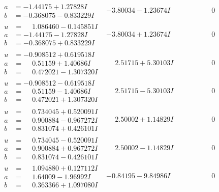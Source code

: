 \documentclass[1p]{elsarticle_modified}
\theoremstyle{definition}
\begin{document}
$$\begin{array}{c|c|c}
\begin{aligned}
a &= -1.44175 + 1.27828 I \\
b &= -0.368075 - 0.833229 I\end{aligned}
 & -3.80034 - 1.23674 I & \phantom{-0.000000 } 0 \\ \hline\begin{aligned}
u &= \phantom{-}1.086460 - 0.145851 I \\
a &= -1.44175 - 1.27828 I \\
b &= -0.368075 + 0.833229 I\end{aligned}
 & -3.80034 + 1.23674 I & \phantom{-0.000000 } 0 \\ \hline\begin{aligned}
u &= -0.908512 + 0.619518 I \\
a &= \phantom{-}0.51159 + 1.40686 I \\
b &= \phantom{-}0.472021 - 1.307320 I\end{aligned}
 & \phantom{-}2.51715 + 5.30103 I & \phantom{-0.000000 } 0 \\ \hline\begin{aligned}
u &= -0.908512 - 0.619518 I \\
a &= \phantom{-}0.51159 - 1.40686 I \\
b &= \phantom{-}0.472021 + 1.307320 I\end{aligned}
 & \phantom{-}2.51715 - 5.30103 I & \phantom{-0.000000 } 0 \\ \hline\begin{aligned}
u &= \phantom{-}0.734045 + 0.520091 I \\
a &= \phantom{-}0.900884 - 0.967272 I \\
b &= \phantom{-}0.831074 + 0.426101 I\end{aligned}
 & \phantom{-}2.50002 + 1.14829 I & \phantom{-0.000000 } 0 \\ \hline\begin{aligned}
u &= \phantom{-}0.734045 - 0.520091 I \\
a &= \phantom{-}0.900884 + 0.967272 I \\
b &= \phantom{-}0.831074 - 0.426101 I\end{aligned}
 & \phantom{-}2.50002 - 1.14829 I & \phantom{-0.000000 } 0 \\ \hline\begin{aligned}
u &= \phantom{-}1.094880 + 0.127112 I \\
a &= \phantom{-}1.64009 - 1.96992 I \\
b &= \phantom{-}0.363366 + 1.097080 I\end{aligned}
 & -0.84195 - 9.84986 I & \phantom{-0.000000 } 0 \\ \hline\begin{aligned}

\end{aligned}
\end{array}$$
\end{document}
